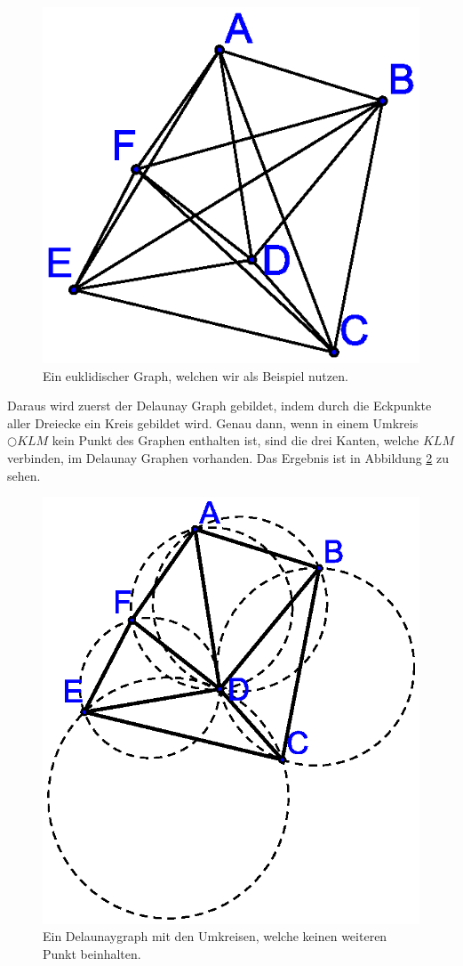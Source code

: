 \documentclass[a4paper,twoside]{IEEEtran}
\begin{document}
\begin{figure}[h!]
\centering
\includegraphics[width=0.6\linewidth]{beispielgraph.eps}
\caption{Ein euklidischer Graph, welchen wir als Beispiel nutzen.}
\label{fig:beispielgraph}
\end{figure}

Daraus wird zuerst der Delaunay Graph gebildet, indem durch die Eckpunkte aller Dreiecke ein Kreis gebildet wird.
Genau dann, wenn in einem Umkreis $\bigcirc{KLM} $ kein Punkt des Graphen enthalten ist, sind die drei Kanten, welche $KLM $ verbinden, im Delaunay Graphen vorhanden.
Das Ergebnis ist in Abbildung \ref{fig:delaunay} zu sehen.

\begin{figure}[h!]
\centering
\includegraphics[width=0.8\linewidth]{Delaunay_Graph.eps}
\caption{Ein Delaunaygraph mit den Umkreisen, welche keinen weiteren Punkt beinhalten.}
\label{fig:delaunay}
\end{figure}
\end{document}
